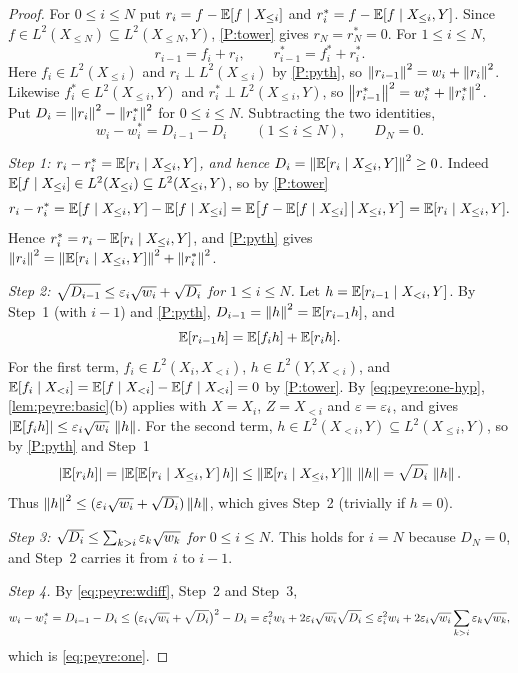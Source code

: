 \begin{proof}
For $0\le i\le N$ put $r_i=f-\mathbb E[f\mid X_{\le i}]$ and
$r_i^*=f-\mathbb E[f\mid X_{\le i},Y]$. Since
$f\in L^2(X_{\le N})\subseteq L^2(X_{\le N},Y)$, \ref{P:tower} gives
$r_N=r_N^*=0$. For $1\le i\le N$,
\[
  r_{i-1}=f_i+r_i,\qquad r_{i-1}^*=f_i^*+r_i^* .
\]
Here $f_i\in L^2(X_{\le i})$ and $r_i\perp L^2(X_{\le i})$ by \ref{P:pyth},
so $\left\|r_{i-1}\right\|^2=w_i+\left\|r_i\right\|^2$. Likewise
$f_i^*\in L^2(X_{\le i},Y)$ and $r_i^*\perp L^2(X_{\le i},Y)$, so
$\left\|r_{i-1}^*\right\|^2=w_i^*+\left\|r_i^*\right\|^2$. Put
$D_i=\left\|r_i\right\|^2-\left\|r_i^*\right\|^2$ for $0\le i\le N$. Subtracting the two
identities,
\begin{equation}\label{eq:peyre:wdiff}
  w_i-w_i^*=D_{i-1}-D_i\qquad(1\le i\le N),\qquad D_N=0 .
\end{equation}

\emph{Step 1: $r_i-r_i^*=\mathbb E[r_i\mid X_{\le i},Y]$, and hence
$D_i=\left\|\mathbb E[r_i\mid X_{\le i},Y]\right\|^2\ge0$.} Indeed
$\mathbb E[f\mid X_{\le i}]\in L^2(X_{\le i})\subseteq L^2(X_{\le i},Y)$, so by
\ref{P:tower}
\[
  r_i-r_i^*=\mathbb E[f\mid X_{\le i},Y]-\mathbb E[f\mid X_{\le i}]
  =\mathbb E\big[f-\mathbb E[f\mid X_{\le i}]\,\big|\,X_{\le i},Y\big]
  =\mathbb E[r_i\mid X_{\le i},Y].
\]
Hence $r_i^*=r_i-\mathbb E[r_i\mid X_{\le i},Y]$, and \ref{P:pyth} gives
$\left\|r_i\right\|^2=\left\|\mathbb E[r_i\mid X_{\le i},Y]\right\|^2+\left\|r_i^*\right\|^2$.

\emph{Step 2: $\sqrt{D_{i-1}}\le\varepsilon_i\sqrt{w_i}+\sqrt{D_i}$ for
$1\le i\le N$.} Let $h=\mathbb E[r_{i-1}\mid X_{<i},Y]$. By Step~1 (with $i-1$) and
\ref{P:pyth}, $D_{i-1}=\left\|h\right\|^2=\mathbb E[r_{i-1}h]$, and
\[
  \mathbb E[r_{i-1}h]=\mathbb E[f_ih]+\mathbb E[r_ih].
\]
For the first term, $f_i\in L^2(X_i,X_{<i})$, $h\in L^2(Y,X_{<i})$, and
$\mathbb E[f_i\mid X_{<i}]=\mathbb E[f\mid X_{<i}]-\mathbb E[f\mid X_{<i}]=0$ by \ref{P:tower}.
By \eqref{eq:peyre:one-hyp}, \cref{lem:peyre:basic}(b) applies with $X=X_i$,
$Z=X_{<i}$ and $\varepsilon=\varepsilon_i$, and gives
$|\mathbb E[f_ih]|\le\varepsilon_i\sqrt{w_i}\,\left\|h\right\|$. For the second term,
$h\in L^2(X_{<i},Y)\subseteq L^2(X_{\le i},Y)$, so by \ref{P:pyth} and
Step~1
\[
  |\mathbb E[r_ih]|=|\mathbb E[\mathbb E[r_i\mid X_{\le i},Y]\,h]|\le
  \left\|\mathbb E[r_i\mid X_{\le i},Y]\right\|\,\left\|h\right\|=\sqrt{D_i}\,\left\|h\right\| .
\]
Thus $\left\|h\right\|^2\le(\varepsilon_i\sqrt{w_i}+\sqrt{D_i})\left\|h\right\|$, which gives Step~2
(trivially if $h=0$).

\emph{Step 3: $\sqrt{D_i}\le\sum_{k>i}\varepsilon_k\sqrt{w_k}$ for $0\le i\le N$.}
This holds for $i=N$ because $D_N=0$, and Step~2 carries it from $i$ to
$i-1$.

\emph{Step 4.} By \eqref{eq:peyre:wdiff}, Step~2 and Step~3,
\[
  w_i-w_i^*=D_{i-1}-D_i\le\big(\varepsilon_i\sqrt{w_i}+\sqrt{D_i}\big)^2-D_i
  =\varepsilon_i^2w_i+2\varepsilon_i\sqrt{w_i}\sqrt{D_i}
  \le\varepsilon_i^2w_i+2\varepsilon_i\sqrt{w_i}\sum_{k>i}\varepsilon_k\sqrt{w_k},
\]
which is \eqref{eq:peyre:one}.
\end{proof}

